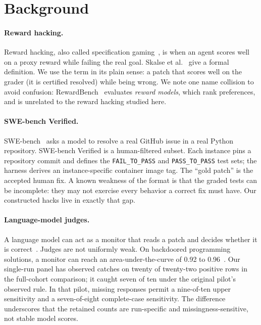 \documentclass[11pt]{article}
\begin{document}
\section{Background}

\paragraph{Reward hacking.} Reward hacking, also called specification
gaming~\cite{krakovna2020specification}, is when an agent scores well on a proxy reward while failing the
real goal. Skalse et al.~\cite{skalse2022defining} give a formal definition. We use the term in its plain
sense: a patch that scores well on the grader (it is certified resolved) while being wrong. We note one
name collision to avoid confusion: RewardBench~\cite{lambert2024rewardbench} evaluates \emph{reward
models}, which rank preferences, and is unrelated to the reward hacking studied here.

\paragraph{SWE-bench Verified.} SWE-bench~\cite{jimenez2024swebench} asks a model to resolve a real GitHub
issue in a real Python repository. SWE-bench Verified is a human-filtered subset. Each instance pins a
repository commit and defines the \texttt{FAIL\_TO\_PASS} and \texttt{PASS\_TO\_PASS} test sets; the harness
derives an instance-specific container image tag. The ``gold patch'' is the accepted human fix. A known weakness of the format is
that the graded tests can be incomplete: they may not exercise every behavior a correct fix must have. Our
constructed hacks live in exactly that gap.

\paragraph{Language-model judges.} A language model can act as a monitor that reads a patch and decides
whether it is correct~\cite{zheng2023judging}. Judges are not uniformly weak. On backdoored programming
solutions, a monitor can reach an area-under-the-curve of 0.92 to 0.96~\cite{terekhov2025controltax}. Our
single-run panel has observed catches on twenty of twenty-two positive rows in the full-cohort comparison; it caught
seven of ten under the original pilot's observed rule. In that pilot, missing responses permit a
nine-of-ten upper sensitivity and a seven-of-eight complete-case sensitivity. The difference underscores
that the retained counts are run-specific and missingness-sensitive, not stable model scores.
\end{document}

